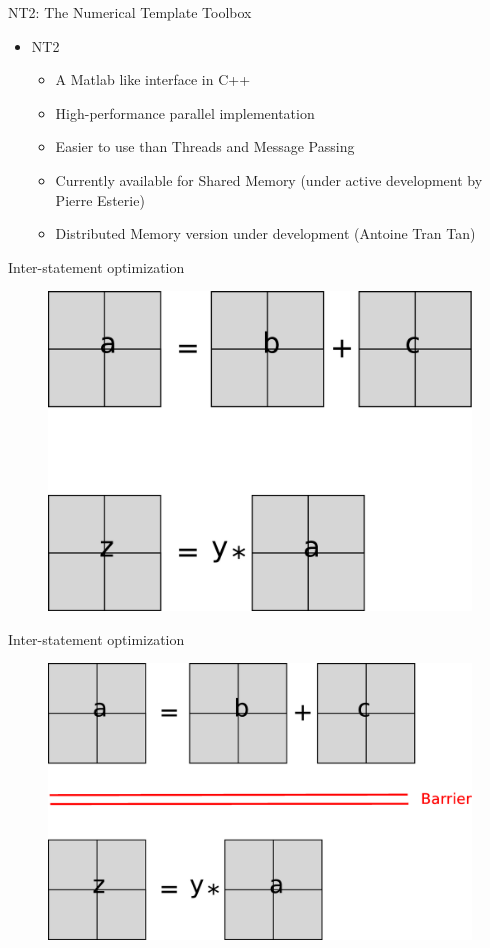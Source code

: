 \documentclass[svgnames]{beamer}
\begin{document}
\begin{frame}{NT2: The Numerical Template Toolbox}
\begin{itemize}
	\item NT2
	\begin{itemize}
		\item A Matlab like interface in C++
		\item	High-performance parallel implementation
		\item Easier to use than Threads and Message Passing
		\item Currently available for Shared Memory (under active development by Pierre Esterie)
		\item Distributed Memory version under development (Antoine Tran Tan)
	\end{itemize}
\end{itemize}
\end{frame}
\begin{frame}{Inter-statement optimization}
\begin{figure}
\includegraphics[width=.5\textwidth]{images/inter-exp}
\end{figure}
\end{frame}
\begin{frame}{Inter-statement optimization}
\begin{figure}
\includegraphics[width=.5\textwidth]{images/inter-exp-barrier}
\end{figure}
\end{frame}
\end{document}
